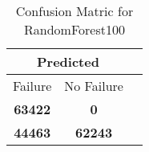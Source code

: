 \begin{table}[] 
\caption{Confusion Matric for RandomForest100} 
\label{Table: Prediction Accuracy-NoneRandomForest100SVMEKF-ignoresolarPanelDipole100.9EKF-top2-solarPanelDipole} 
\centering 
\begin{tabular} 
 {@{}ccc@{}} 
\toprule 
\multicolumn{2}{c}{\textbf{Predicted}}
 \\ \midrule 
\multicolumn{1}{|c|}{Failure} & 
\multicolumn{1}{c|}{No Failure}
 \\ \midrule 
\multicolumn{1}{|c|}{\color{green}\textbf{63422}} & 
\multicolumn{1}{c|}{\color{red}\textbf{0}}
 \\ \midrule 
\multicolumn{1}{|c|}{\color{red}\textbf{44463}} & 
\multicolumn{1}{c|}{\color{green}\textbf{62243}}
 \\ \bottomrule 
\end{tabular} 
\end{table} 
